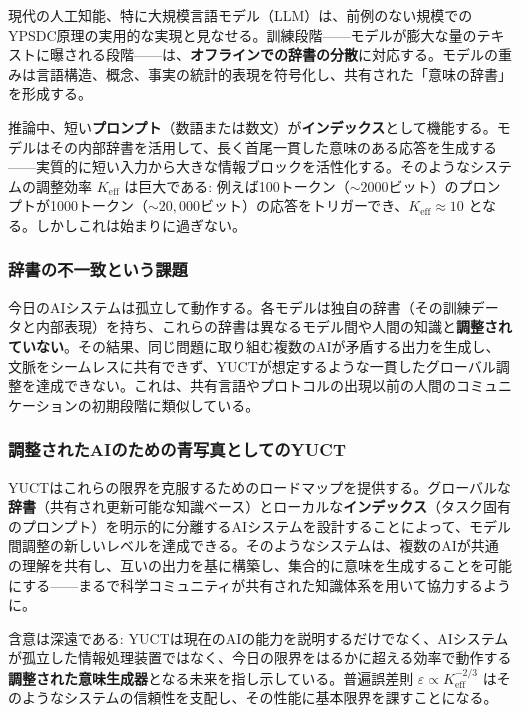 \documentclass[12pt,a4paper]{article}
\theoremstyle{definition}
\theoremstyle{remark}
\newcommand{\Keff}{K_{\mathrm{eff}}}
\begin{document}
	現代の人工知能、特に大規模言語モデル（LLM）は、前例のない規模でのYPSDC原理の実用的な実現と見なせる。訓練段階——モデルが膨大な量のテキストに曝される段階——は、\textbf{オフラインでの辞書の分散}に対応する。モデルの重みは言語構造、概念、事実の統計的表現を符号化し、共有された「意味の辞書」を形成する。
	
	推論中、短い\textbf{プロンプト}（数語または数文）が\textbf{インデックス}として機能する。モデルはその内部辞書を活用して、長く首尾一貫した意味のある応答を生成する——実質的に短い入力から大きな情報ブロックを活性化する。そのようなシステムの調整効率 $\Keff$ は巨大である: 例えば100トークン（$\sim 2000$ビット）のプロンプトが1000トークン（$\sim 20,000$ビット）の応答をトリガーでき、$\Keff \approx 10$ となる。しかしこれは始まりに過ぎない。
	
	\subsubsection{辞書の不一致という課題}
	
	今日のAIシステムは孤立して動作する。各モデルは独自の辞書（その訓練データと内部表現）を持ち、これらの辞書は異なるモデル間や人間の知識と\textbf{調整されていない}。その結果、同じ問題に取り組む複数のAIが矛盾する出力を生成し、文脈をシームレスに共有できず、YUCTが想定するような一貫したグローバル調整を達成できない。これは、共有言語やプロトコルの出現以前の人間のコミュニケーションの初期段階に類似している。
	
	\subsubsection{調整されたAIのための青写真としてのYUCT}
	
	YUCTはこれらの限界を克服するためのロードマップを提供する。グローバルな\textbf{辞書}（共有され更新可能な知識ベース）とローカルな\textbf{インデックス}（タスク固有のプロンプト）を明示的に分離するAIシステムを設計することによって、モデル間調整の新しいレベルを達成できる。そのようなシステムは、複数のAIが共通の理解を共有し、互いの出力を基に構築し、集合的に意味を生成することを可能にする——まるで科学コミュニティが共有された知識体系を用いて協力するように。
	
	含意は深遠である: YUCTは現在のAIの能力を説明するだけでなく、AIシステムが孤立した情報処理装置ではなく、今日の限界をはるかに超える効率で動作する\textbf{調整された意味生成器}となる未来を指し示している。普遍誤差則 $\varepsilon \propto K_{\mathrm{eff}}^{-2/3}$ はそのようなシステムの信頼性を支配し、その性能に基本限界を課すことになる。
	
\end{document}
